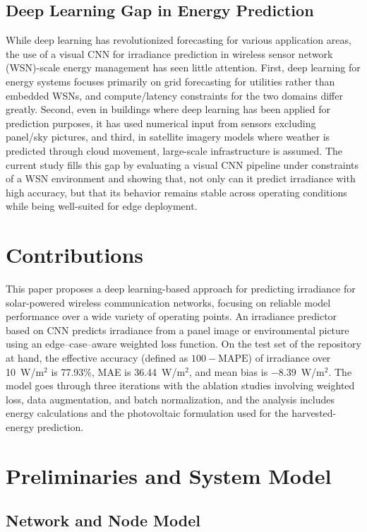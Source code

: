 \documentclass[journal]{IEEEtran}
\begin{document}
\subsection{Deep Learning Gap in Energy Prediction}

While deep learning has revolutionized forecasting for various application areas, the use of a visual CNN for irradiance prediction in wireless sensor network (WSN)-scale energy management has seen little attention. First, deep learning for energy systems focuses primarily on grid forecasting for utilities rather than embedded WSNs, and compute/latency constraints for the two domains differ greatly. Second, even in buildings where deep learning has been applied for prediction purposes, it has used numerical input from sensors excluding panel/sky pictures, and third, in satellite imagery models where weather is predicted through cloud movement, large-scale infrastructure is assumed. The current study fills this gap by evaluating a visual CNN pipeline under constraints of a WSN environment and showing that, not only can it predict irradiance with high accuracy, but that its behavior remains stable across operating conditions while being well-suited for edge deployment.

\section{Contributions}
This paper proposes a deep learning-based approach for predicting irradiance for solar-powered wireless communication networks, focusing on reliable model performance over a wide variety of operating points. An irradiance predictor based on CNN predicts irradiance from a panel image or environmental picture using an edge–case–aware weighted loss function. On the test set of the repository at hand, the effective accuracy (defined as $100-\mathrm{MAPE}$) of irradiance over 10~W/m$^2$ is 77.93\%, MAE is 36.44~W/m$^2$, and mean bias is $-8.39$~W/m$^2$. The model goes through three iterations with the ablation studies involving weighted loss, data augmentation, and batch normalization, and the analysis includes energy calculations and the photovoltaic formulation used for the harvested-energy prediction.

\section{Preliminaries and System Model}

\subsection{Network and Node Model}
\end{document}
